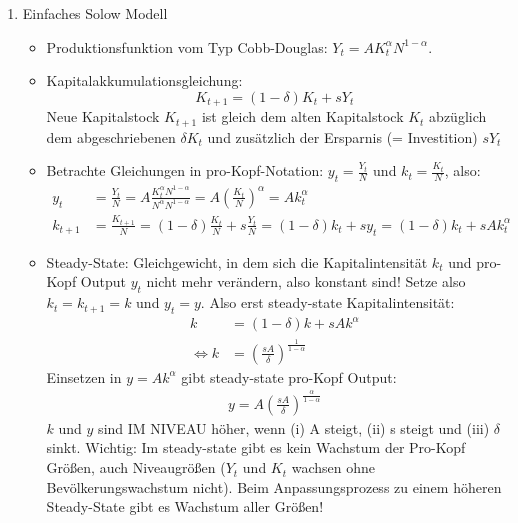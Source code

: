 \documentclass{scrartcl}
\begin{document}
\begin{enumerate}
\item Einfaches Solow Modell
\begin{itemize}
  \item Produktionsfunktion vom Typ Cobb-Douglas: $Y_t = A K_t^\alpha N^{1-\alpha}$.
  \item Kapitalakkumulationsgleichung: $$K_{t+1}=(1-\delta)K_t + s Y_t$$
  Neue Kapitalstock $K_{t+1}$ ist gleich dem alten Kapitalstock $K_t$ abz\"{u}glich dem abgeschriebenen $\delta K_t$ und zus\"{a}tzlich der Ersparnis (= Investition) $sY_t$
  \item Betrachte Gleichungen in pro-Kopf-Notation: $y_t = \frac{Y_t}{N}$ und $k_t = \frac{K_t}{N}$, also:
      \begin{align*}
        y_t &= \frac{Y_t}{N} = A \frac{K_t^\alpha N^{1-\alpha}}{N^\alpha N^{1-\alpha}} = A \left(\frac{K_t}{N}\right)^\alpha = A k_t^\alpha\\
        k_{t+1} &= \frac{K_{t+1}}{N} = (1-\delta)\frac{K_t}{N} + s \frac{Y_t}{N} = (1-\delta)k_t + s y_t = (1-\delta)k_t + s A k_t^\alpha
      \end{align*}
  \item Steady-State: Gleichgewicht, in dem sich die Kapitalintensit\"{a}t $k_t$ und pro-Kopf Output $y_t$ nicht mehr ver\"{a}ndern, also konstant sind! Setze also $k_t=k_{t+1}=k$ und $y_t=y$. Also erst steady-state Kapitalintensit\"{a}t:
      \begin{align*}
      k &= (1-\delta)k + sAk^\alpha\\
      \Leftrightarrow k & = \left(\frac{sA}{\delta}\right)^{\frac{1}{1-\alpha}}
      \end{align*}
      Einsetzen in $y = A k^\alpha$ gibt steady-state pro-Kopf Output:
      \begin{align*}
        y = A \left(\frac{sA}{\delta}\right)^{\frac{\alpha}{1-\alpha}}
      \end{align*}
      $k$ und $y$ sind IM NIVEAU h\"{o}her, wenn (i) A steigt, (ii) s steigt und (iii) $\delta$ sinkt. Wichtig: Im steady-state gibt es kein Wachstum der Pro-Kopf Gr\"{o}{\ss}en, auch Niveaugr\"{o}{\ss}en ($Y_t$ und $K_t$ wachsen ohne Bev\"{o}lkerungswachstum nicht). Beim Anpassungsprozess zu einem h\"{o}heren Steady-State gibt es Wachstum aller Gr\"{o}{\ss}en!\\

\end{itemize}
\end{enumerate}
\end{document}
